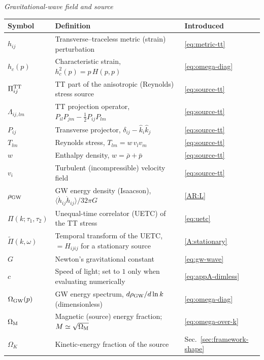 \documentclass[10pt,prd,aps,nobibnotes,superscriptaddress,preprintnumbers,notitlepage]{revtex4-1}
\begin{document}
\medskip\noindent \emph{Gravitational-wave field and source}\par\nobreak\smallskip
\noindent\begin{tabular}{@{}p{} p{} p{}@{}}
\hline\hline
Symbol & Definition & Introduced \\
\hline
$h_{ij}$              & Transverse--traceless metric (strain) perturbation & \eqref{eq:metric-tt}\\
$h_c(p)$              & Characteristic strain, $h_c^2(p)=p\,H(p,p)$ & \eqref{eq:omega-diag}\\
$\Pi_{ij}^{\rm TT}$   & TT part of the anisotropic (Reynolds) stress source & \eqref{eq:source-tt}\\
$\Lambda_{ij,lm}$     & TT projection operator, $P_{il}P_{jm}-\tfrac12P_{ij}P_{lm}$ & \eqref{eq:source-tt}\\
$P_{ij}$              & Transverse projector, $\delta_{ij}-\hat k_i\hat k_j$ & \eqref{eq:source-tt}\\
$T_{lm}$              & Reynolds stress, $T_{lm}=w\,v_lv_m$ & \eqref{eq:source-tt}\\
$w$                   & Enthalpy density, $w=\bar\rho+\bar p$ & \eqref{eq:source-tt}\\
$v_i$                 & Turbulent (incompressible) velocity field & \eqref{eq:source-tt}\\
$\rho_{\rm GW}$       & GW energy density (Isaacson), $\langle\dot h_{ij}\dot h_{ij}\rangle/32\pi G$ & \eqref{AR:L}\\
$\Pi(k;\tau_1,\tau_2)$ & Unequal-time correlator (UETC) of the TT stress & \eqref{eq:uetc}\\
$\widetilde\Pi(k,\omega)$ & Temporal transform of the UETC, $=H_{ijij}$ for a stationary source & \eqref{A:stationary}\\
$G$                   & Newton's gravitational constant & \eqref{eq:gw-wave}\\
$c$                   & Speed of light; set to $1$ only when evaluating numerically & \eqref{eq:appA-dimless}\\
$\Omega_{\rm GW}(p)$  & GW energy spectrum, $d\rho_{\rm GW}/d\ln k$ (dimensionless) & \eqref{eq:omega-diag}\\
$\Omega_{\rm M}$      & Magnetic (source) energy fraction; $M\simeq\sqrt{\Omega_{\rm M}}$ & \eqref{eq:omega-over-k}\\
$\Omega_K$            & Kinetic-energy fraction of the source & Sec.~\ref{sec:framework-shape}\\

\end{tabular}
\end{document}

